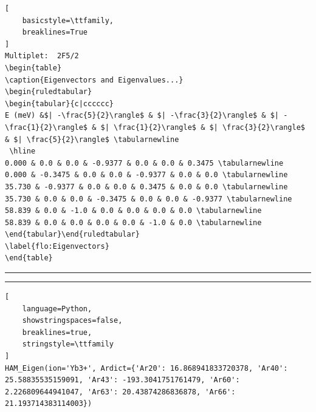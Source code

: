 \documentclass{article}
\begin{document}
\begin{lstlisting}[
    basicstyle=\ttfamily,
    breaklines=True
]
Multiplet:  2F5/2
\begin{table}
\caption{Eigenvectors and Eigenvalues...}
\begin{ruledtabular}
\begin{tabular}{c|cccccc}
E (meV) &$| -\frac{5}{2}\rangle$ & $| -\frac{3}{2}\rangle$ & $| -\frac{1}{2}\rangle$ & $| \frac{1}{2}\rangle$ & $| \frac{3}{2}\rangle$ & $| \frac{5}{2}\rangle$ \tabularnewline
 \hline 
0.000 & 0.0 & 0.0 & -0.9377 & 0.0 & 0.0 & 0.3475 \tabularnewline
0.000 & -0.3475 & 0.0 & 0.0 & -0.9377 & 0.0 & 0.0 \tabularnewline
35.730 & -0.9377 & 0.0 & 0.0 & 0.3475 & 0.0 & 0.0 \tabularnewline
35.730 & 0.0 & 0.0 & -0.3475 & 0.0 & 0.0 & -0.9377 \tabularnewline
58.839 & 0.0 & -1.0 & 0.0 & 0.0 & 0.0 & 0.0 \tabularnewline
58.839 & 0.0 & 0.0 & 0.0 & 0.0 & -1.0 & 0.0 \tabularnewline
\end{tabular}\end{ruledtabular}
\label{flo:Eigenvectors}
\end{table}
\end{lstlisting}
\hrule
\bigskip
\hrule
\smallskip
{}
\begin{lstlisting}[
    language=Python, 
    showstringspaces=false, 
    breaklines=true,
    stringstyle=\ttfamily
]
HAM_Eigen(ion='Yb3+', Ardict={'Ar20': 16.868941833720378, 'Ar40': 25.58835535159091, 'Ar43': -193.3041751761479, 'Ar60': 2.226809644941047, 'Ar63': 20.43874286836878, 'Ar66': 21.193714383114003})
\end{lstlisting}
\end{document}
